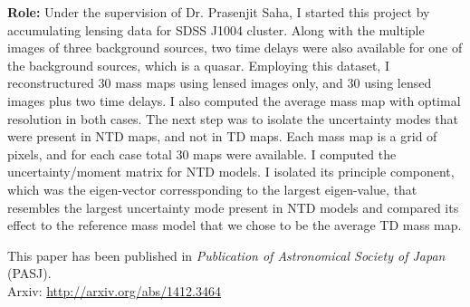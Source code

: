 {\bf Role:} Under the supervision of Dr. Prasenjit Saha, I started this project
by accumulating lensing data for SDSS J1004 cluster. Along with the multiple
images of three background sources, two time delays were also available for one 
of the background sources, which is a quasar. Employing this dataset, I reconstructured
30 mass maps using lensed images only, and 30 using lensed images plus two time
delays. I also computed the average mass map with optimal resolution in both
cases. The next step was to isolate the uncertainty modes that were present
in NTD maps, and not in TD maps. Each mass map is a grid of pixels, and for each
case total 30 maps were available. 
I computed the uncertainty/moment matrix for NTD models.
I isolated its principle component, which was the eigen-vector corressponding
to the largest eigen-value, that resembles the largest uncertainty
mode present in NTD models and compared its effect to the reference 
mass model that we chose to be the average TD mass map. 

This paper has been published in {\it Publication of Astronomical Society of Japan} (PASJ). 
\\
Arxiv: \url{http://arxiv.org/abs/1412.3464}

\clearpage
